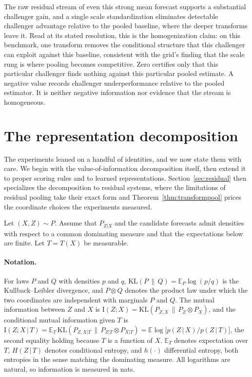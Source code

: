 \documentclass[11pt]{article}
\theoremstyle{remark}
\newcommand{\E}{\mathbb{E}}
\newcommand{\KL}{\mathrm{KL}}
\newcommand{\I}{\mathrm{I}}
\newcommand{\given}{\,|\,}
\begin{document}
The raw residual stream of even this strong mean forecast supports a substantial challenger
gain, and a single scale standardization eliminates detectable challenger advantage relative
to the pooled baseline, where the deeper transforms leave it. Read at its stated resolution,
this is the homogenization claim: on this benchmark, one transform removes the conditional
structure that this challenger can exploit against this baseline, consistent with the grid's
finding that the scale rung is where pooling becomes competitive. Zero certifies only that
this particular challenger finds nothing against this particular pooled estimate. A negative
value records challenger underperformance relative to the pooled estimator. It is neither
negative information nor evidence that the stream is homogeneous.

\section{The representation decomposition}\label{sec:decomposition}

The experiments leaned on a handful of identities, and we now state them with care. We begin
with the value-of-information decomposition itself, then extend it to proper scoring rules
and to learned representations. Section~\ref{sec:residual} then specializes the
decomposition to residual systems, where the limitations of residual pooling take their
exact form and Theorem~\ref{thm:transformpool} prices the coordinate choices the
experiments measured.

Let $(X,Z)\sim P$. Assume that $P_{Z|X}$ and the candidate forecasts admit densities with respect
to a common dominating measure and that the expectations below are finite. Let $T=T(X)$ be
measurable.

\paragraph{Notation.} For laws $P$ and $Q$ with densities $p$ and $q$,
$\KL(P\,\|\,Q)=\E_{P}\log(p/q)$ is the Kullback--Leibler divergence, and
$P\otimes Q$ denotes the product law under which the two coordinates are independent with
marginals $P$ and $Q$. The mutual
information between $Z$ and $X$ is $\I(Z;X)=\KL(P_{Z,X}\,\|\,P_Z\otimes P_X)$, and the
conditional mutual information given $T$ is
$\I(Z;X\given T)=\E_T\,\KL(P_{Z,X|T}\,\|\,P_{Z|T}\otimes P_{X|T})
=\E\log\big[p(Z\given X)/p(Z\given T)\big]$, the second equality holding because $T$ is a
function of $X$. $\E_T$ denotes expectation over $T$, $H(Z\given T)$ denotes conditional entropy, and
$h(\cdot)$ differential entropy, both entropies in the sense matching the dominating
measure. All logarithms are natural, so information is measured in nats.
\end{document}
